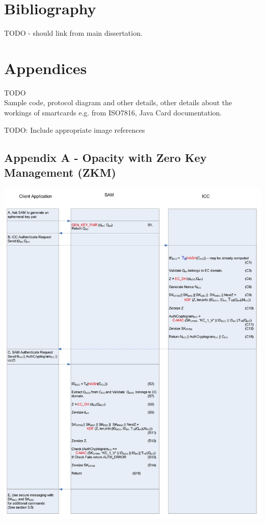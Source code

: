\documentclass[12pt]{article}
\begin{document}
\pagebreak

\section{Bibliography}
TODO - should link from main dissertation.
\pagebreak

\section{Appendices}
TODO\\
Sample code, protocol diagram and other details, other details about the workings of smartcards e.g. from ISO7816, Java Card documentation.

TODO: Include appropriate image references

\subsection{Appendix A - Opacity with Zero Key Management (ZKM)}
\includegraphics[scale=0.4]{appendix/opacity-zkm}
\end{document}
